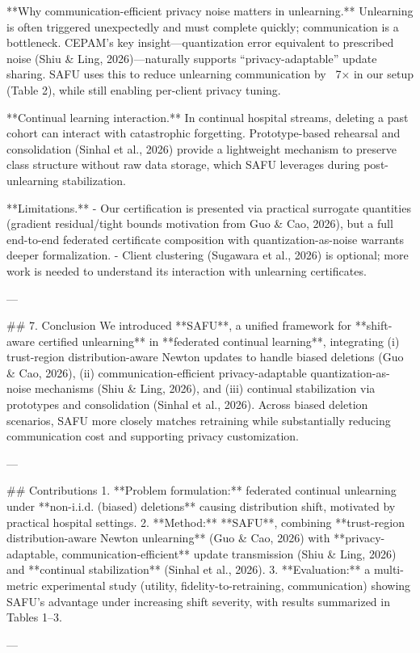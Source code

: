 **Why communication-efficient privacy noise matters in unlearning.**  
Unlearning is often triggered unexpectedly and must complete quickly; communication is a bottleneck. CEPAM’s key insight—quantization error equivalent to prescribed noise (Shiu & Ling, 2026)—naturally supports “privacy-adaptable” update sharing. SAFU uses this to reduce unlearning communication by ~7× in our setup (Table 2), while still enabling per-client privacy tuning.

**Continual learning interaction.**  
In continual hospital streams, deleting a past cohort can interact with catastrophic forgetting. Prototype-based rehearsal and consolidation (Sinhal et al., 2026) provide a lightweight mechanism to preserve class structure without raw data storage, which SAFU leverages during post-unlearning stabilization.

**Limitations.**
- Our certification is presented via practical surrogate quantities (gradient residual/tight bounds motivation from Guo & Cao, 2026), but a full end-to-end federated certificate composition with quantization-as-noise warrants deeper formalization.
- Client clustering (Sugawara et al., 2026) is optional; more work is needed to understand its interaction with unlearning certificates.

---

## 7. Conclusion
We introduced **SAFU**, a unified framework for **shift-aware certified unlearning** in **federated continual learning**, integrating (i) trust-region distribution-aware Newton updates to handle biased deletions (Guo & Cao, 2026), (ii) communication-efficient privacy-adaptable quantization-as-noise mechanisms (Shiu & Ling, 2026), and (iii) continual stabilization via prototypes and consolidation (Sinhal et al., 2026). Across biased deletion scenarios, SAFU more closely matches retraining while substantially reducing communication cost and supporting privacy customization.

---

## Contributions
1. **Problem formulation:** federated continual unlearning under **non-i.i.d. (biased) deletions** causing distribution shift, motivated by practical hospital settings.
2. **Method:** **SAFU**, combining **trust-region distribution-aware Newton unlearning** (Guo & Cao, 2026) with **privacy-adaptable, communication-efficient** update transmission (Shiu & Ling, 2026) and **continual stabilization** (Sinhal et al., 2026).
3. **Evaluation:** a multi-metric experimental study (utility, fidelity-to-retraining, communication) showing SAFU’s advantage under increasing shift severity, with results summarized in Tables 1–3.

---